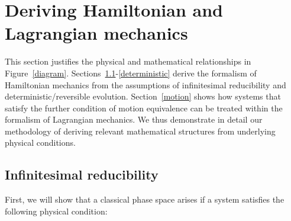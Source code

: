 \documentclass[letterpaper]{article}
\begin{document}



\section{Deriving Hamiltonian and Lagrangian mechanics}
\label{derivation}


This section justifies the physical and mathematical relationships in Figure~\ref{diagram}.
Sections~\ref{infinitesimal}-\ref{deterministic} derive the formalism of Hamiltonian mechanics from the assumptions of infinitesimal reducibility and deterministic/reversible evolution. Section~\ref{motion} shows how systems that satisfy the further condition of motion equivalence can be treated within the formalism of Lagrangian mechanics. We thus demonstrate in detail our methodology of deriving  relevant mathematical structures from underlying physical conditions.


\subsection{Infinitesimal reducibility}
\label{infinitesimal}

First, we will show that a classical phase space arises if a system satisfies the following physical condition:
\end{document}
